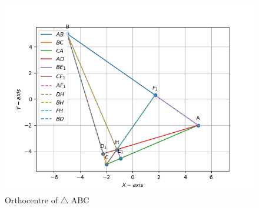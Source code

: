 \documentclass[10pt]{book}
\begin{document}
\begin{figure}[H]
    \centering
    \includegraphics{figs/H_intersection.png}
    \caption{Orthocentre of $\triangle$ ABC}
    \label{fig:H_intersection}
\end{figure}
\newpage
\end{document}
